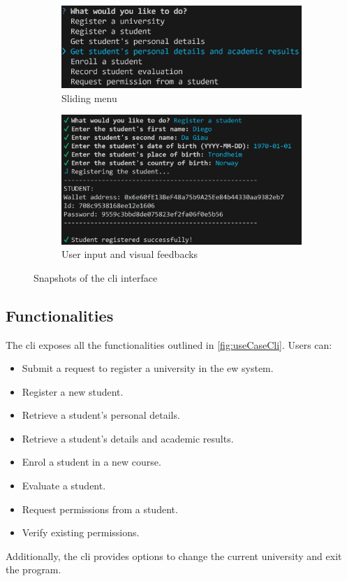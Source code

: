 \begin{figure}
    \centering
    \begin{subfigure}{.5\textwidth}
        \centering
        \includegraphics[width=\textwidth]{figures/CLI screen 1.png}
        \caption{Sliding menu}
        \label{sfig:cliDesign1}
    \end{subfigure}
    \hfill
    \begin{subfigure}{.60\textwidth}
        \centering
        \includegraphics[width=\textwidth]{figures/CLI screen 2.png}
        \caption{User input and visual feedbacks}
        \label{sfig:cliDesign2}
    \end{subfigure}
    \caption[Different aspects of the \acrshort{cli} interface.]{Snapshots of the \acrshort{cli} interface}
    \label{fig:clifigs}
\end{figure}

\subsection{Functionalities}
The \acrshort{cli} exposes all the functionalities outlined in \cref{fig:useCaseCli}. Users can:
\begin{itemize}
    \item Submit a request to register a university in the \acrshort{ew} system.
    \item Register a new student.
    \item Retrieve a student’s personal details.
    \item Retrieve a student’s details and academic results.
    \item Enrol a student in a new course.
    \item Evaluate a student.
    \item Request permissions from a student.
    \item Verify existing permissions.
\end{itemize}
Additionally, the \acrshort{cli} provides options to change the current university and exit the program.

